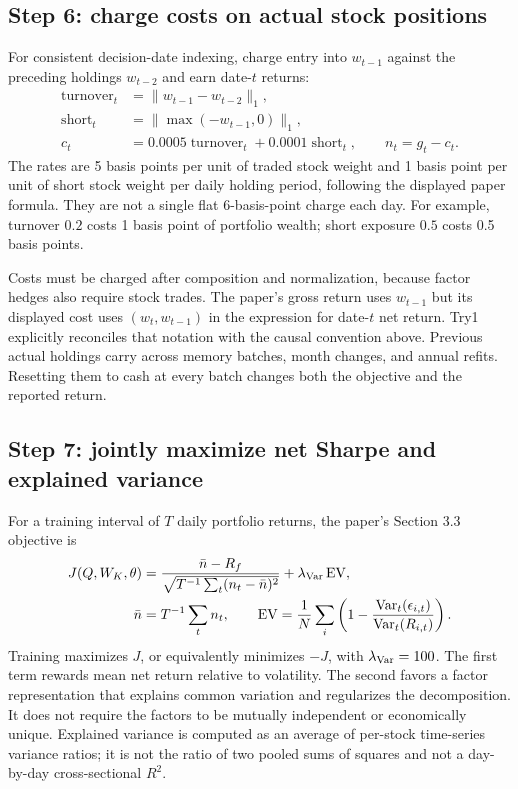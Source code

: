 \documentclass[11pt]{article}
\begin{document}
\subsection{Step 6: charge costs on actual stock positions}
\label{sec:costs}

For consistent decision-date indexing, charge entry into $w_{t-1}$
against the preceding holdings $w_{t-2}$ and earn date-$t$ returns:
\begin{align}
 \operatorname{turnover}_t&=\|w_{t-1}-w_{t-2}\|_1,\\
 \operatorname{short}_t&=\|\max(-w_{t-1},0)\|_1,\\
 c_t&=0.0005\operatorname{turnover}_t
       +0.0001\operatorname{short}_t,\qquad n_t=g_t-c_t.
 \label{eq:costs}
\end{align}
The rates are 5 basis points per unit of traded stock weight and 1 basis
point per unit of short stock weight per daily holding period, following
the displayed paper formula. They are not a single flat 6-basis-point
charge each day. For example, turnover $0.2$ costs 1 basis point of
portfolio wealth; short exposure $0.5$ costs 0.5 basis points.

Costs must be charged after composition and normalization, because
factor hedges also require stock trades. The paper's gross return uses
$w_{t-1}$ but its displayed cost uses $(w_t,w_{t-1})$ in the expression
for date-$t$ net return. Try1 explicitly reconciles that notation with
the causal convention above. Previous actual holdings carry across
memory batches, month changes, and annual refits. Resetting them to
cash at every batch changes both the objective and the reported return.

\subsection{Step 7: jointly maximize net Sharpe and explained variance}
\label{sec:objective}

For a training interval of $T$ daily portfolio returns, the paper's
Section 3.3 objective is
\begin{align}
 J(Q,W_K,\theta)
 &=\frac{\bar n-R_f}{\sqrt{T^{-1}\sum_t(n_t-\bar n)^2}}
 +\lambda_{\rm Var}\operatorname{EV},
 \label{eq:objective}\\
 \bar n&=T^{-1}\sum_tn_t,\qquad
 \operatorname{EV}=\frac1N\sum_i
 \left(1-\frac{\operatorname{Var}_t(\epsilon_{i,t})}
 {\operatorname{Var}_t(R_{i,t})}\right).
 \label{eq:ev}
\end{align}
Training maximizes $J$, or equivalently minimizes $-J$, with
$\lambda_{\rm Var}=100$. The first term rewards mean net return
relative to volatility. The second favors a factor representation that
explains common variation and regularizes the decomposition. It does
not require the factors to be mutually independent or economically
unique. Explained variance is computed as an average of per-stock
time-series variance ratios; it is not the ratio of two pooled sums
of squares and not a day-by-day cross-sectional $R^2$.
\end{document}
